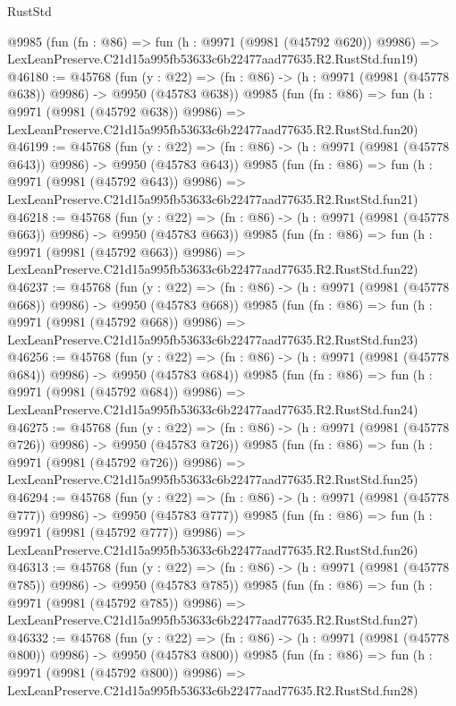 \begin{lexlean}{RustStd}
\begin{coremodule}
    @9985
    (fun (fn : @86) =>
    fun (h : @9971 (@9981 (@45792 @620)) @9986) =>
    LexLeanPreserve.C21d15a995fb53633c6b22477aad77635.R2.RustStd.fun19)
@46180 := @45768
    (fun (y : @22) => (fn : @86) -> (h : @9971 (@9981 (@45778 @638)) @9986) -> @9950 (@45783 @638))
    @9985
    (fun (fn : @86) =>
    fun (h : @9971 (@9981 (@45792 @638)) @9986) =>
    LexLeanPreserve.C21d15a995fb53633c6b22477aad77635.R2.RustStd.fun20)
@46199 := @45768
    (fun (y : @22) => (fn : @86) -> (h : @9971 (@9981 (@45778 @643)) @9986) -> @9950 (@45783 @643))
    @9985
    (fun (fn : @86) =>
    fun (h : @9971 (@9981 (@45792 @643)) @9986) =>
    LexLeanPreserve.C21d15a995fb53633c6b22477aad77635.R2.RustStd.fun21)
@46218 := @45768
    (fun (y : @22) => (fn : @86) -> (h : @9971 (@9981 (@45778 @663)) @9986) -> @9950 (@45783 @663))
    @9985
    (fun (fn : @86) =>
    fun (h : @9971 (@9981 (@45792 @663)) @9986) =>
    LexLeanPreserve.C21d15a995fb53633c6b22477aad77635.R2.RustStd.fun22)
@46237 := @45768
    (fun (y : @22) => (fn : @86) -> (h : @9971 (@9981 (@45778 @668)) @9986) -> @9950 (@45783 @668))
    @9985
    (fun (fn : @86) =>
    fun (h : @9971 (@9981 (@45792 @668)) @9986) =>
    LexLeanPreserve.C21d15a995fb53633c6b22477aad77635.R2.RustStd.fun23)
@46256 := @45768
    (fun (y : @22) => (fn : @86) -> (h : @9971 (@9981 (@45778 @684)) @9986) -> @9950 (@45783 @684))
    @9985
    (fun (fn : @86) =>
    fun (h : @9971 (@9981 (@45792 @684)) @9986) =>
    LexLeanPreserve.C21d15a995fb53633c6b22477aad77635.R2.RustStd.fun24)
@46275 := @45768
    (fun (y : @22) => (fn : @86) -> (h : @9971 (@9981 (@45778 @726)) @9986) -> @9950 (@45783 @726))
    @9985
    (fun (fn : @86) =>
    fun (h : @9971 (@9981 (@45792 @726)) @9986) =>
    LexLeanPreserve.C21d15a995fb53633c6b22477aad77635.R2.RustStd.fun25)
@46294 := @45768
    (fun (y : @22) => (fn : @86) -> (h : @9971 (@9981 (@45778 @777)) @9986) -> @9950 (@45783 @777))
    @9985
    (fun (fn : @86) =>
    fun (h : @9971 (@9981 (@45792 @777)) @9986) =>
    LexLeanPreserve.C21d15a995fb53633c6b22477aad77635.R2.RustStd.fun26)
@46313 := @45768
    (fun (y : @22) => (fn : @86) -> (h : @9971 (@9981 (@45778 @785)) @9986) -> @9950 (@45783 @785))
    @9985
    (fun (fn : @86) =>
    fun (h : @9971 (@9981 (@45792 @785)) @9986) =>
    LexLeanPreserve.C21d15a995fb53633c6b22477aad77635.R2.RustStd.fun27)
@46332 := @45768
    (fun (y : @22) => (fn : @86) -> (h : @9971 (@9981 (@45778 @800)) @9986) -> @9950 (@45783 @800))
    @9985
    (fun (fn : @86) =>
    fun (h : @9971 (@9981 (@45792 @800)) @9986) =>
    LexLeanPreserve.C21d15a995fb53633c6b22477aad77635.R2.RustStd.fun28)

\end{coremodule}
\end{lexlean}
